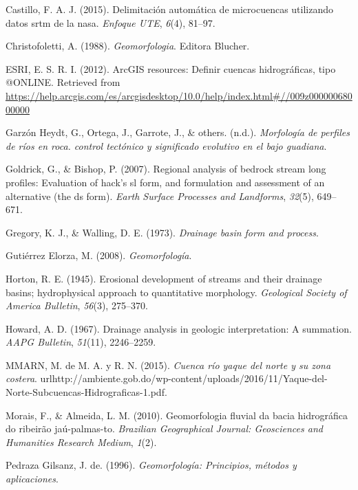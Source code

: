 \documentclass[11pt,]{article}
\begin{document}
\hypertarget{ref-castillo2015delimitacion}{}
Castillo, F. A. J. (2015). Delimitación automática de microcuencas
utilizando datos srtm de la nasa. \emph{Enfoque UTE}, \emph{6}(4),
81--97.

\hypertarget{ref-christofoletti1988geomorfologia}{}
Christofoletti, A. (1988). \emph{Geomorfologia}. Editora Blucher.

\hypertarget{ref-ESRI2012}{}
ESRI, E. S. R. I. (2012). ArcGIS resources: Definir cuencas
hidrográficas, tipo @ONLINE. Retrieved from
\url{https://help.arcgis.com/es/arcgisdesktop/10.0/help/index.html\#//009z00000068000000}

\hypertarget{ref-garzonmorfologia}{}
Garzón Heydt, G., Ortega, J., Garrote, J., \& others. (n.d.).
\emph{Morfología de perfiles de ríos en roca. control tectónico y
significado evolutivo en el bajo guadiana}.

\hypertarget{ref-goldrick2007regional}{}
Goldrick, G., \& Bishop, P. (2007). Regional analysis of bedrock stream
long profiles: Evaluation of hack's sl form, and formulation and
assessment of an alternative (the ds form). \emph{Earth Surface
Processes and Landforms}, \emph{32}(5), 649--671.

\hypertarget{ref-gregory1973drainage}{}
Gregory, K. J., \& Walling, D. E. (1973). \emph{Drainage basin form and
process}.

\hypertarget{ref-gutierrez2008geomorfologia}{}
Gutiérrez Elorza, M. (2008). \emph{Geomorfología}.

\hypertarget{ref-horton1945erosional}{}
Horton, R. E. (1945). Erosional development of streams and their
drainage basins; hydrophysical approach to quantitative morphology.
\emph{Geological Society of America Bulletin}, \emph{56}(3), 275--370.

\hypertarget{ref-howard1967drainage}{}
Howard, A. D. (1967). Drainage analysis in geologic interpretation: A
summation. \emph{AAPG Bulletin}, \emph{51}(11), 2246--2259.

\hypertarget{ref-Mmar2015cuenca}{}
MMARN, M. de M. A. y R. N. (2015). \emph{Cuenca río yaque del norte y su
zona costera}.
urlhttp://ambiente.gob.do/wp-content/uploads/2016/11/Yaque-del-Norte-Subcuencas-Hidrograficas-1.pdf.

\hypertarget{ref-morais2010geomorfologia}{}
Morais, F., \& Almeida, L. M. (2010). Geomorfologia fluvial da bacia
hidrográfica do ribeirão jaú-palmas-to. \emph{Brazilian Geographical
Journal: Geosciences and Humanities Research Medium}, \emph{1}(2).

\hypertarget{ref-pedraza1996geomorfologia}{}
Pedraza Gilsanz, J. de. (1996). \emph{Geomorfología: Principios, métodos
y aplicaciones}.
\end{document}
